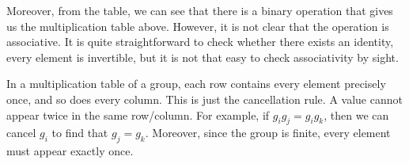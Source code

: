 \documentclass[a4paper, openany]{memoir}
\theoremstyle{definition}
\theoremstyle{plain}
\begin{document}
Moreover, from the table, we can see that there is a binary operation that gives us the multiplication table above. However, it is not clear that the operation is associative. It is quite straightforward to check whether there exists an identity, every element is invertible, but it is not that easy to check associativity by sight. 

In a multiplication table of a group, each row contains every element precisely once, and so does every column. This is just the cancellation rule. A value cannot appear twice in the same row/column. For example, if $g_i g_j = g_i g_k$, then we can cancel $g_i$ to find that $g_j = g_k$. Moreover, since the group is finite, every element must appear exactly once.
\end{document}
